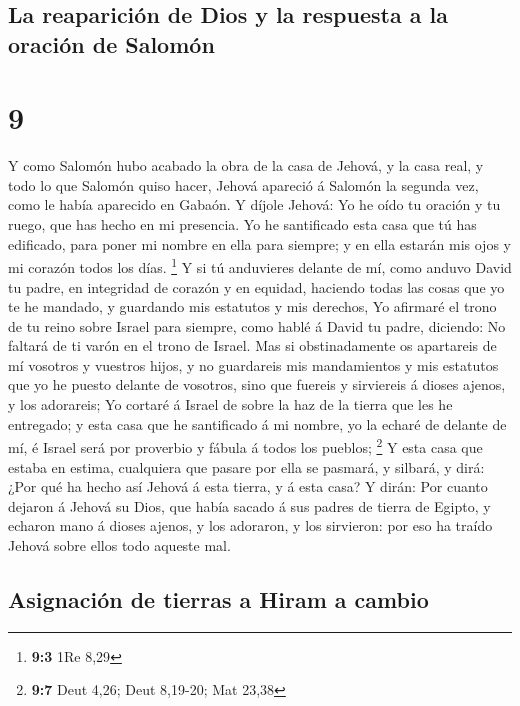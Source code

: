 \hypertarget{la-reapariciuxf3n-de-dios-y-la-respuesta-a-la-oraciuxf3n-de-salomuxf3n}{%
\subsection{La reaparición de Dios y la respuesta a la oración de
Salomón}\label{la-reapariciuxf3n-de-dios-y-la-respuesta-a-la-oraciuxf3n-de-salomuxf3n}}

\hypertarget{section-8}{%
\section{9}\label{section-8}}

 Y como Salomón hubo acabado la obra de la casa de Jehová, y
la casa real, y todo lo que Salomón quiso hacer,  Jehová
apareció á Salomón la segunda vez, como le había aparecido en Gabaón.
 Y díjole Jehová: Yo he oído tu oración y tu ruego, que has
hecho en mi presencia. Yo he santificado esta casa que tú has edificado,
para poner mi nombre en ella para siempre; y en ella estarán mis ojos y
mi corazón todos los días. \footnote{\textbf{9:3} 1Re 8,29} 
Y si tú anduvieres delante de mí, como anduvo David tu padre, en
integridad de corazón y en equidad, haciendo todas las cosas que yo te
he mandado, y guardando mis estatutos y mis derechos,  Yo
afirmaré el trono de tu reino sobre Israel para siempre, como hablé á
David tu padre, diciendo: No faltará de ti varón en el trono de Israel.
 Mas si obstinadamente os apartareis de mí vosotros y
vuestros hijos, y no guardareis mis mandamientos y mis estatutos que yo
he puesto delante de vosotros, sino que fuereis y sirviereis á dioses
ajenos, y los adorareis;  Yo cortaré á Israel de sobre la
haz de la tierra que les he entregado; y esta casa que he santificado á
mi nombre, yo la echaré de delante de mí, é Israel será por proverbio y
fábula á todos los pueblos; \footnote{\textbf{9:7} Deut 4,26; Deut
  8,19-20; Mat 23,38}  Y esta casa que estaba en estima,
cualquiera que pasare por ella se pasmará, y silbará, y dirá: ¿Por qué
ha hecho así Jehová á esta tierra, y á esta casa?  Y dirán:
Por cuanto dejaron á Jehová su Dios, que había sacado á sus padres de
tierra de Egipto, y echaron mano á dioses ajenos, y los adoraron, y los
sirvieron: por eso ha traído Jehová sobre ellos todo aqueste mal.

\hypertarget{asignaciuxf3n-de-tierras-a-hiram-a-cambio}{%
\subsection{Asignación de tierras a Hiram a
cambio}\label{asignaciuxf3n-de-tierras-a-hiram-a-cambio}}

